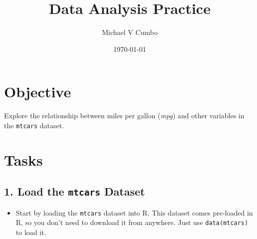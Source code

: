 \documentclass[11pt]{article}\usepackage[]{graphicx}\usepackage[]{xcolor}
\title{\textbf{Data Analysis Practice}}
\author{Michael V Cumbo}
\date{\today}
\begin{document}
\maketitle
\section*{Objective}
Explore the relationship between miles per gallon (\textit{mpg}) and other variables in the \texttt{mtcars} dataset.

\section*{Tasks}

\subsection*{1. Load the \texttt{mtcars} Dataset}
\begin{itemize}
    \item Start by loading the \texttt{mtcars} dataset into R. This dataset comes pre-loaded in R, so you don't need to download it from anywhere. Just use \texttt{data(mtcars)} to load it.
\end{itemize}
\end{document}
